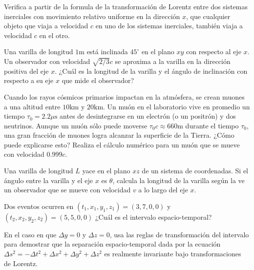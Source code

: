 \documentclass[12pt]{article}
\newenvironment{exercise}[2][Ejercicio]{\begin{trivlist} 
\item[\hskip \labelsep {\bfseries #1}\hskip \labelsep {\bfseries #2.}]}{\end{trivlist}}
\begin{document}
\begin{exercise}{1.4} 
Verifica a partir de la formula de la transformación de Lorentz entre dos sistemas inerciales con movimiento relativo uniforme en la dirección $x$, que cualquier objeto que viaja a velocidad 
$c$ en uno de los sistemas inerciales, también viaja a velocidad $c$ en el otro.
\end{exercise}


\begin{exercise}{1.5} Una varilla de longitud $1 \text{m}$ está inclinada $45^\circ$ en el plano $xy$ con respecto al eje $x$. Un observador con velocidad $\sqrt{2/3}c$ se aproxima a la varilla en la dirección positiva del eje $x$. ¿Cuál es la longitud de la varilla y el ángulo de inclinación con respecto a su eje $x$ que mide el observador?
\end{exercise}

\begin{exercise}{1.6} Cuando los rayos cósmicos primarios impactan en la atmósfera, se crean muones a una altitud entre $10 \text{km}$ y $20 \text{km}$. Un muón en el laboratorio vive en promedio un tiempo $\tau_0 = 2.2 \mu\text{s}$ antes de desintegrarse en un electrón (o un positrón) y dos neutrinos. Aunque un muón sólo puede moverse $\tau_0 c \approx 660 \text{m}$ durante el tiempo $\tau_0$, una gran fracción de muones logra alcanzar la superficie de la Tierra. ¿Cómo puede explicarse esto? Realiza el cálculo numérico para un muón que se mueve con velocidad $0.999c$.
\end{exercise}

\begin{exercise}{1.7}
Una varilla de longitud $L$ yace en el plano $xz$ de un sistema de coordenadas. Si el ángulo entre la varilla y el eje $x$ es $\theta$, calcula la longitud de la varilla según la ve un observador que se mueve con velocidad $v$ a lo largo del eje $x$.    
\end{exercise}

\begin{exercise}{1.8}
Dos eventos ocurren en $(t_1, x_1, y_1, z_1)=(3, 7, 0, 0)$ y $(t_2, x_2, y_2, z_2)=(5, 5, 0, 0)$ ¿Cuál es el intervalo espacio-temporal?    
\end{exercise}

\begin{exercise}{1.9}
En el caso en que $\Delta y =0$ y $\Delta z =0$, usa las reglas de transformación del intervalo para demostrar que la separación espacio-temporal dada por la ecuación $\Delta s^2 = - \Delta t^2 + \Delta x^2 + \Delta y^2 + \Delta z^2$ es realmente invariante bajo transformaciones de Lorentz.
\end{exercise}  
\end{document}
